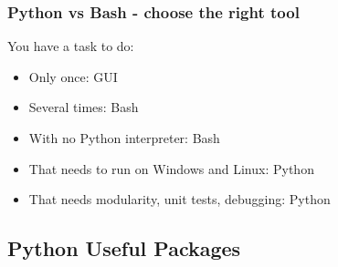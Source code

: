 \begin{frame}\frametitle{Python vs Bash - choose the right tool}
   \centering
   You have a task to do: \\[2ex]
   \begin{itemize}
      \item Only once: GUI
      \item Several times: Bash
      \item With no Python interpreter: Bash
      \item That needs to run on Windows and Linux: Python
      \item That needs modularity, unit tests, debugging: Python
   \end{itemize}
\end{frame}

\subsection{Python Useful Packages}

